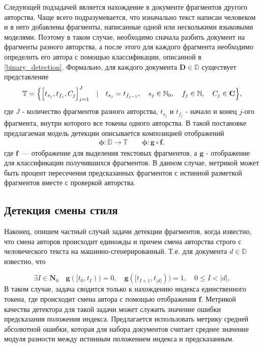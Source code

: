 Следующей подзадачей является нахождение в документе фрагментов другого авторства. Чаще всего подразумевается, что изначально текст написан человеком и в него добавлены фрагменты, написанные одной или несколькими языковыми моделями. Поэтому в таком случае, необходимо сначала разбить документ на фрагменты разного авторства, а после этого для каждого фрагмента необходимо определить его автора с помощью классификации, описанной в \ref{binary_detection}.
Формально, для каждого документа $ \mathbf{D} \in \mathbb{D}$ существует представление
$$ \mathbb{T} = \Bigl\{\Big[t_{s_j}, t_{f_j}, C_j\Big]_{j = 1}^{J} \quad|\quad t_{s_j} = t_{f_{j - 1}},\quad s_j \in \mathbb{N}_0,\quad f_j \in \mathbb{N}, \quad C_j \in  \mathbf{C} \Bigr\},$$
где $J$ - количество фрагментов разного авторства, $t_{s_j}$ и $t_{f_j}$ - начало и конец $j$-ого фрагмента, внутри  которого все токены одного авторства. 
В такой постановке предлагаемая модель детекции описывается композицией отображений
\begin{align}
   \mathbf{\phi}: \mathbb{D} \rightarrow \mathbb{T} \quad \quad \mathbf{\phi} : \mathbf{g} \circ \mathbf{f},
\end{align}
где $\mathbf{f}$~--- отображение для выделения текстовых фрагментов, а $\mathbf{g}$  - отображение для классификации получившихся фрагментов.
В данном случае, метрикой может быть процент пересечения предсказанных фрагментов с истинной разметкой фрагментов вместе с проверкой авторства.


\subsection{Детекция смены стиля}
\label{style_change}
Наконец,  опишем частный случай задачи детекции фрагментов, когда известно, что смена авторов происходит единожды и причем смена авторства строго с человеческого текста на машинно-сгенерированный. Т.е. для документа $d \in \mathbb{D}$  известно, что

$$\exists I \in \mathbf{N}_0 \quad \mathbf{g}([t_{0}, t_{I})) = 0, \quad \mathbf{g}([t_{I + 1},  t_{|d|})) =1,  \quad  0 \leq I < |d|,$$
В таком случае, задача сводится только к нахождению индекса единственного токена, где  происходит смена автора с помощью отображения $\mathbf{f}$. 
Метрикой качества детектора для такой задачи может служить значение ошибки предсказания положения индекса. Предлагается использовать метрику средней абсолютной ошибки, которая для набора документов считает среднее значение модуля разности между истинным положением индекса и предсказанным. 
